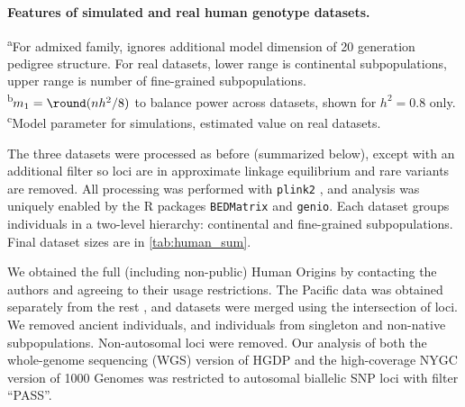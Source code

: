 \documentclass[11pt]{article}
\begin{document}
\begin{linenumbers}
\begin{table}[b!]
  \centering
  \footnotesize
  \caption{
    \textbf{Features of simulated and real human genotype datasets.}
  }
  \label{tab:human_sum}
  \begin{flushleft} 
    \textsuperscript{a}For admixed family, ignores additional model dimension of 20 generation pedigree structure.
    For real datasets, lower range is continental subpopulations, upper range is number of fine-grained subpopulations.\\
    \textsuperscript{b}$m_1 = \round( n h^2 / 8 )$ to balance power across datasets, shown for $h^2=0.8$ only.\\
    \textsuperscript{c}Model parameter for simulations, estimated value on real datasets.
  \end{flushleft}
\end{table}

The three datasets were processed as before \citep{ochoa_new_2019} (summarized below), except with an additional filter so loci are in approximate linkage equilibrium and rare variants are removed.
All processing was performed with \texttt{plink2} \citep{chang_second-generation_2015}, and analysis was uniquely enabled by the R packages \texttt{BEDMatrix} \citep{grueneberg_bgdata_2019} and \texttt{genio}.
Each dataset groups individuals in a two-level hierarchy: continental and fine-grained subpopulations.
Final dataset sizes are in \cref{tab:human_sum}.

We obtained the full (including non-public) Human Origins by contacting the authors and agreeing to their usage restrictions.
The Pacific data \citep{skoglund_genomic_2016} was obtained separately from the rest \citep{lazaridis_ancient_2014,lazaridis_genomic_2016}, and datasets were merged using the intersection of loci.
We removed ancient individuals, and individuals from singleton and non-native subpopulations.
Non-autosomal loci were removed.
Our analysis of both the whole-genome sequencing (WGS) version of HGDP \citep{bergstrom_insights_2020} and the high-coverage NYGC version of 1000 Genomes \citep{fairley_international_2020} was restricted to autosomal biallelic SNP loci with filter ``PASS''.


\end{linenumbers}
\end{document}
